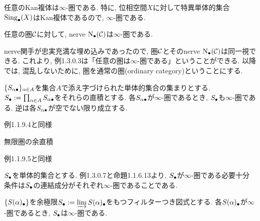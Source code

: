 \documentclass[uplatex, a4paper, 14Q, dvipdfmx]{jsreport}
\begin{document}
\begin{example}
  任意のKan複体は$\infty$-圏である. 
  特に, 位相空間$X$に対して特異単体的集合$\Sing_\bullet(X)$はKan複体であるので, $\infty$-圏である.
\end{example}

\begin{example}
  任意の圏$\calC$に対して, nerve $\N(\calC)$は$\infty$-圏である. 
\end{example}

\begin{remark}
  nerve関手が忠実充満な埋め込みであったので, 圏$\calC$とそのnerve $\N(\calC)$は同一視できる.
  これより, 例1.3.0.3は「任意の圏は$\infty$-圏である」ということができる. 
  以降では, 混乱しないために, 圏を通常の圏(ordinary category)ということにする. 
\end{remark}

\begin{example}
  $\{S_{\al \bullet}\}_{\al \in A}$を集合$A$で添え字づけられた単体的集合の集まりとする. 
  $\S:=\prod_{\al \in A}S_{\al \bullet}$をそれらの直積とする. 
  各$S_{\al \bullet}$が$\infty$-圏であるとき, $\S$も$\infty$-圏である. 
  逆は各$S_{\al \bullet}$が空でない限り成立する. 
\end{example}

\begin{Proof}
  例1.1.9.4と同様
\end{Proof}

\begin{example}
  無限圏の余直積
\end{example}

\begin{Proof}
  例1.1.9.5と同様
\end{Proof}

\begin{remark}
  $\S$を単体的集合とする. 
  例1.3.0.7と命題1.1.6.13より, $\S$が$\infty$-圏である必要十分条件は$\S$の連結成分がそれぞれ$\infty$-圏であることである. 
\end{remark}

\begin{remark}
  $\{S(\al)_\bullet\}$を余極限$\S:=\varinjlim S(\al)_\bullet$をもつフィルターつき図式とする.
  各$S(\al)_\bullet$が$\infty$-圏であるとき, $\S$は$\infty$-圏である. 
\end{remark}
\end{document}
